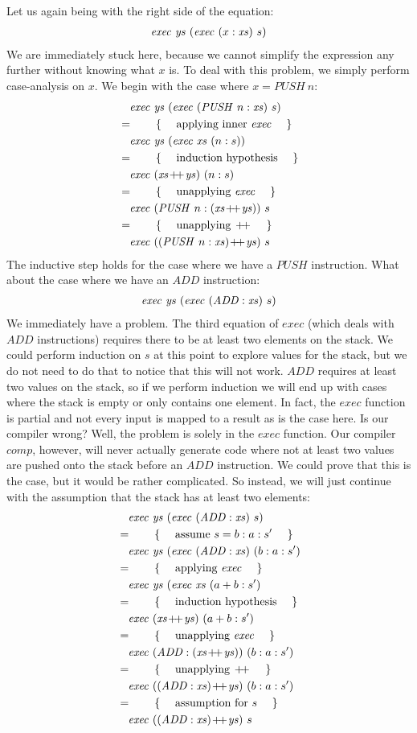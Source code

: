 Let us again being with the right side of the equation:
\begin{align*}
&\quad \mathit{exec}~\mathit{ys}~(\mathit{exec}~(x:\mathit{xs})~s)
\end{align*}
We are immediately stuck here, because we cannot simplify the expression any further without knowing what $x$ is. To deal with this problem, we simply perform case-analysis on $x$. We begin with the case where $x = \mathit{PUSH}~n$:
\begin{align*}
\expr{\mathit{exec}~\mathit{ys}~(\mathit{exec}~(\mathit{PUSH}~n:\mathit{xs})~s)}
\hint{applying inner $\mathit{exec}$}
\expr{\mathit{exec}~\mathit{ys}~(\mathit{exec}~\mathit{xs}~(n:s))}
\hint{induction hypothesis}
\expr{\mathit{exec}~(\mathit{xs} \append \mathit{ys})~(n:s)}
\hint{unapplying $\mathit{exec}$}
\expr{\mathit{exec}~(\mathit{PUSH}~n : (\mathit{xs} \append \mathit{ys}))~s}
\hint{unapplying $\append$}
\lastexpr{\mathit{exec}~((\mathit{PUSH}~n : \mathit{xs}) \append \mathit{ys})~s}
\end{align*}
The inductive step holds for the case where we have a $\mathit{PUSH}$ instruction. What about the case where we have an $\mathit{ADD}$ instruction:
\begin{align*}
&\quad \mathit{exec}~\mathit{ys}~(\mathit{exec}~(\mathit{ADD}:\mathit{xs})~s)
\end{align*}
We immediately have a problem. The third equation of $\mathit{exec}$ (which deals with $\mathit{ADD}$ instructions) requires there to be at least two elements on the stack. We could perform induction on $s$ at this point to explore values for the stack, but we do not need to do that to notice that this will not work. $\mathit{ADD}$ requires at least two values on the stack, so if we perform induction we will end up with cases where the stack is empty or only contains one element. In fact, the $\mathit{exec}$ function is partial and not every input is mapped to a result as is the case here. Is our compiler wrong? Well, the problem is solely in the $\mathit{exec}$ function. Our compiler $\mathit{comp}$, however, will never actually generate code where not at least two values are pushed onto the stack before an $\mathit{ADD}$ instruction. We could prove that this is the case, but it would be rather complicated. So instead, we will just continue with the assumption that the stack has at least two elements:
\begin{align*}
\expr{\mathit{exec}~\mathit{ys}~(\mathit{exec}~(\mathit{ADD}:\mathit{xs})~s)}
\hint{assume $s = b : a : s'$}
\expr{\mathit{exec}~\mathit{ys}~(\mathit{exec}~(\mathit{ADD}:\mathit{xs})~(b : a : s')}
\hint{applying $\mathit{exec}$}
\expr{\mathit{exec}~\mathit{ys}~(\mathit{exec}~\mathit{xs}~(a+b : s')}
\hint{induction hypothesis}
\expr{\mathit{exec}~(\mathit{xs} \append \mathit{ys})~(a+b : s')}
\hint{unapplying $\mathit{exec}$}
\expr{\mathit{exec}~(\mathit{ADD} : (\mathit{xs} \append \mathit{ys}))~(b : a : s')}
\hint{unapplying $\append$}
\expr{\mathit{exec}~((\mathit{ADD} : \mathit{xs}) \append \mathit{ys})~(b : a : s')}
\hint{assumption for $s$}
\lastexpr{\mathit{exec}~((\mathit{ADD} : \mathit{xs}) \append \mathit{ys})~s}
\end{align*}
